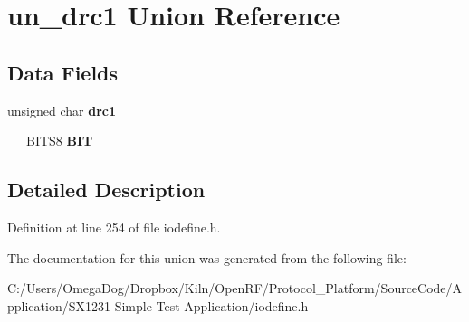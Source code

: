 \hypertarget{unionun__drc1}{\section{un\-\_\-drc1 Union Reference}
\label{unionun__drc1}
}
\subsection*{Data Fields}
\begin{DoxyCompactItemize}
\item 
\hypertarget{unionun__drc1_ad9f872028a30e3e5f285a7bb20162cde}{unsigned char {\bfseries drc1}}\label{unionun__drc1_ad9f872028a30e3e5f285a7bb20162cde}

\item 
\hypertarget{unionun__drc1_a2380249ebc8b86627030ff1ecb6bb6ed}{\hyperlink{struct_____b_i_t_s8}{\-\_\-\-\_\-\-B\-I\-T\-S8} {\bfseries B\-I\-T}}\label{unionun__drc1_a2380249ebc8b86627030ff1ecb6bb6ed}

\end{DoxyCompactItemize}


\subsection{Detailed Description}


Definition at line 254 of file iodefine.\-h.



The documentation for this union was generated from the following file\-:\begin{DoxyCompactItemize}
\item 
C\-:/\-Users/\-Omega\-Dog/\-Dropbox/\-Kiln/\-Open\-R\-F/\-Protocol\-\_\-\-Platform/\-Source\-Code/\-Application/\-S\-X1231 Simple Test Application/iodefine.\-h\end{DoxyCompactItemize}
